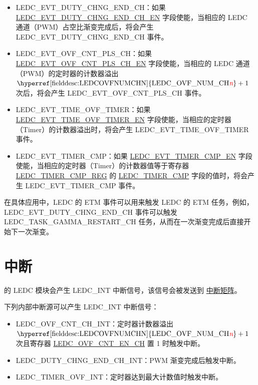 \documentclass[main\_\_CN.tex]{subfiles}
\begin{document}
\begin{itemize}
    \item LEDC\_EVT\_DUTY\_CHNG\_END\_CH：如果 \hyperref[fielddesc:LEDCEVTDUTYCHNGENDCHNEN]{LEDC\_EVT\_DUTY\_CHNG\_END\_CH\_EN} 字段使能，当相应的 LEDC 通道（PWM）占空比渐变完成后，将会产生 LEDC\_EVT\_DUTY\_CHNG\_END\_CH 事件。
    \item LEDC\_EVT\_OVF\_CNT\_PLS\_CH：如果 \hyperref[fielddesc:LEDCEVTOVFCNTPLSCHNEN]{LEDC\_EVT\_OVF\_CNT\_PLS\_CH\_EN} 字段使能，当相应的 LEDC 通道（PWM）的定时器的计数器溢出 $ \textrm{\hyperref[fielddesc:LEDCOVFNUMCHN]{LEDC\_OVF\_NUM\_CH\regindex{n}}} + 1 $ 次后，将会产生 LEDC\_EVT\_OVF\_CNT\_PLS\_CH 事件。
    \item LEDC\_EVT\_TIME\_OVF\_TIMER：如果 \hyperref[fielddesc:LEDCEVTTIMEOVFTIMERXEN]{LEDC\_EVT\_TIME\_OVF\_TIMER\_EN} 字段使能，当相应的定时器（Timer）的计数器溢出时，将会产生 LEDC\_EVT\_TIME\_OVF\_TIMER 事件。
    \item LEDC\_EVT\_TIMER\_CMP：如果 \hyperref[fielddesc:LEDCEVTTIMERXCMPEN]{LEDC\_EVT\_TIMER\_CMP\_EN} 字段使能，当相应的定时器（Timer）的计数器值等于寄存器 \hyperref[regdesc:LEDCTIMERXCMPREG]{LEDC\_TIMER\_CMP\_REG} 的 \hyperref[fielddesc:LEDCTIMERXCMP]{LEDC\_TIMER\_CMP} 字段的值时，将会产生 LEDC\_EVT\_TIMER\_CMP 事件。
\end{itemize}

在具体应用中，LEDC 的 ETM 事件可以用来触发 LEDC 的 ETM 任务，例如，LEDC\_EVT\_DUTY\_CHNG\_END\_CH 事件可以触发 LEDC\_TASK\_GAMMA\_RESTART\_CH 任务，从而在一次渐变完成后直接开始下一次渐变。

\section{中断}

\chipname{} 的 LEDC 模块会产生 LEDC\_INT 中断信号，该信号会被发送到 \hyperref[mod:intmtrx]{中断矩阵}。

下列内部中断源可以产生 LEDC\_INT 中断信号：

\begin{itemize}
\item \label{int:ledc-ovf-cnt}LEDC\_OVF\_CNT\_CH\_INT：定时器计数器溢出 $ \textrm{\hyperref[fielddesc:LEDCOVFNUMCHN]{LEDC\_OVF\_NUM\_CH\regindex{n}}} + 1 $ 次且寄存器 \hyperref[fielddesc:LEDCOVFCNTENCHN]{LEDC\_OVF\_CNT\_EN\_CH} 置 1 时触发中断。
\item \label{int:ledc-duty-chng-end}LEDC\_DUTY\_CHNG\_END\_CH\_INT：PWM 渐变完成后触发中断。
\item \label{int:ledc-timer-ovf}LEDC\_TIMER\_OVF\_INT：定时器达到最大计数值时触发中断。
\end{itemize}
\end{document}
